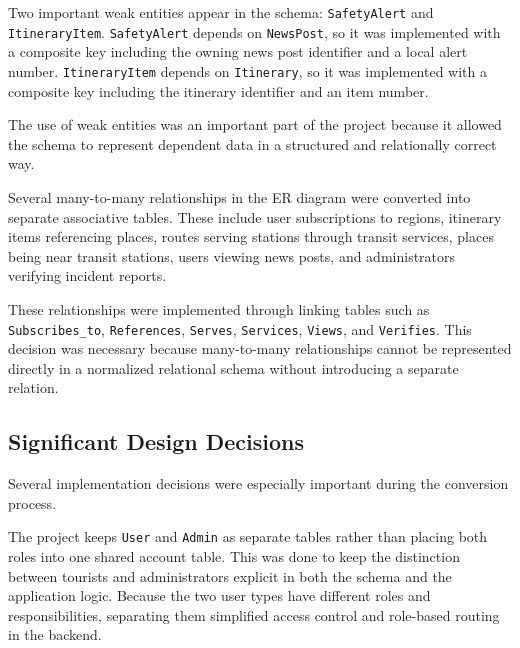 
Two important weak entities appear in the schema: \texttt{SafetyAlert} and \texttt{ItineraryItem}. \texttt{SafetyAlert} depends on \texttt{NewsPost}, so it was implemented with a composite key including the owning news post identifier and a local alert number. \texttt{ItineraryItem} depends on \texttt{Itinerary}, so it was implemented with a composite key including the itinerary identifier and an item number.

The use of weak entities was an important part of the project because it allowed the schema to represent dependent data in a structured and relationally correct way.


Several many-to-many relationships in the ER diagram were converted into separate associative tables. These include user subscriptions to regions, itinerary items referencing places, routes serving stations through transit services, places being near transit stations, users viewing news posts, and administrators verifying incident reports.

These relationships were implemented through linking tables such as \texttt{Subscribes\_to}, \texttt{References}, \texttt{Serves}, \texttt{Services}, \texttt{Views}, and \texttt{Verifies}. This decision was necessary because many-to-many relationships cannot be represented directly in a normalized relational schema without introducing a separate relation.

\subsection{Significant Design Decisions}

Several implementation decisions were especially important during the conversion process.


The project keeps \texttt{User} and \texttt{Admin} as separate tables rather than placing both roles into one shared account table. This was done to keep the distinction between tourists and administrators explicit in both the schema and the application logic. Because the two user types have different roles and responsibilities, separating them simplified access control and role-based routing in the backend.


